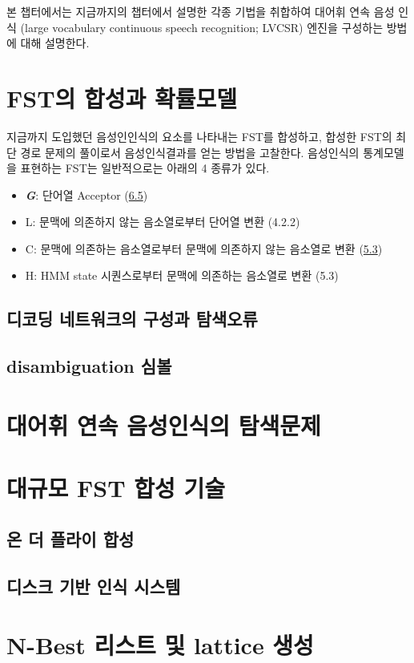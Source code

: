 \documentclass{book}
\begin{document}
\noindent
본 챕터에서는 지금까지의 챕터에서 설명한 각종 기법을 취합하여 대어휘 연속 음성 인식 (large vocabulary continuous speech recognition; LVCSR) 엔진을 구성하는 방법에 대해 설명한다. 

\section{FST의 합성과 확률모델}
지금까지 도입했던 음성인인식의 요소를 나타내는 FST를 합성하고, 합성한 FST의 최단 경로 문제의 풀이로서 음성인식결과를 얻는 방법을 고찰한다. 음성인식의 통계모델을 표현하는 FST는 일반적으로는 아래의 4 종류가 있다. 

\begin{itemize}
    \item \textit{\textbf{G}}: 단어열 Acceptor (\hyperref[sec:N-gram-FST]{6.5})
    \item L: 문맥에 의존하지 않는 음소열로부터 단어열 변환 (4.2.2)
    \item C: 문맥에 의존하는 음소열로부터 문맥에 의존하지 않는 음소열로 변환 (\hyperref[sec:context-dependant-model]{5.3})
    \item H: HMM state 시퀀스로부터 문맥에 의존하는 음소열로 변환 (5.3)
\end{itemize}

\subsection{디코딩 네트워크의 구성과 탐색오류}
\subsection{disambiguation 심볼}

\section{대어휘 연속 음성인식의 탐색문제}
\section{대규모 FST 합성 기술}
\subsection{온 더 플라이 합성}
\subsection{디스크 기반 인식 시스템}

\section{N-Best 리스트 및 lattice 생성}
\end{document}
